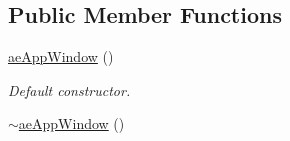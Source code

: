 \subsection*{Public Member Functions}
\begin{DoxyCompactItemize}
\item 
\hyperlink{classae_core_1_1ae_app_window_a6564607e8220037c8c2e716be8b99434}{ae\+App\+Window} ()\hypertarget{classae_core_1_1ae_app_window_a6564607e8220037c8c2e716be8b99434}{}\label{classae_core_1_1ae_app_window_a6564607e8220037c8c2e716be8b99434}

\begin{DoxyCompactList}\small\item\em Default constructor. \end{DoxyCompactList}\item 
\hyperlink{classae_core_1_1ae_app_window_a61315b1f493416e3a5d2d10fa9b20e76}{$\sim$ae\+App\+Window} ()\hypertarget{classae_core_1_1ae_app_window_a61315b1f493416e3a5d2d10fa9b20e76}{}\label{classae_core_1_1ae_app_window_a61315b1f493416e3a5d2d10fa9b20e76}


\end{DoxyCompactItemize}
